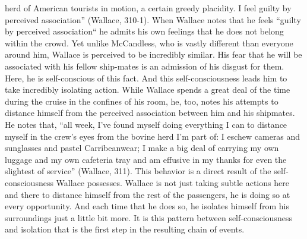 \documentclass[12pt]{article}
\begin{document}
\begin{mla}
herd of American tourists in motion, a certain greedy placidity. I feel guilty
by perceived association'' (Wallace, 310-1). When Wallace notes that he feels
``guilty by perceived association`` he admits his own feelings that he does not
belong within the crowd. Yet unlike McCandless, who is vastly different than
everyone around him, Wallace is perceived to be incredibly similar. His fear
that he will be associated with his fellow ship-mates is an admission of his
disgust for them. Here, he is self-conscious of this fact. And this
self-consciousness leads him to take incredibly isolating action. While Wallace
spends a great deal of the time during the cruise in the confines of his room,
he, too, notes his attempts to distance himself from the perceived association
between him and his shipmates. He notes that, ``all week, I've found myself
doing everything I can to distance myself in the crew's eyes from the bovine
herd I'm part of: I eschew cameras and sunglasses and pastel Carribeanwear; I
make a big deal of carrying my own luggage and my own cafeteria tray and am
effusive in my thanks for even the slightest of service'' (Wallace, 311). This
behavior is a direct result of the self-consciousness Wallace possesses. Wallace
is not just taking subtle actions here and there to distance himself from the
rest of the passengers, he is doing so at every opportunity. And each time that
he does so, he isolates himself from his surroundings just a little bit more. It
is this pattern between self-consciousness and isolation that is the first step
in the resulting chain of events.


\end{mla}
\end{document}
